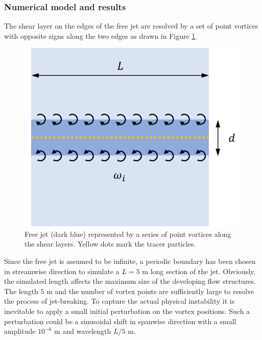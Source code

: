 \documentclass[a4paper,12pt,openany]{book}
\theoremstyle{break}
\begin{document}
\subsubsection{Numerical model and results}
The shear layer on the edges of the free jet are resolved by a set of point vortices with opposite signs along the two edges as drawn in Figure \ref{fig:shear_geom}.
\begin{figure}[H]
  \includegraphics[scale=0.6]{shear_geom.pdf}
  \centering
  \caption{Free jet (dark blue) represented by a series of point vortices along the shear layers. Yellow dots mark the tracer particles. }
  \label{fig:shear_geom}
\end{figure}\vspace*{3pt}
Since the free jet is assumed to be infinite, a periodic boundary has been chosen in streamwise direction to simulate a $L=5$ m long section of the jet. Obviously, the simulated length affects the maximum size of the developing flow structures. The length $5$ m and the number of vortex points are sufficiently large to resolve the process of jet-breaking. To capture the actual physical instability it is inevitable to apply a small initial perturbation on the vortex positions. Such a perturbation could be a sinusoidal shift in spanwise direction with a small amplitude $10^{-6}$ m and wavelength $L/5$ m.
\end{document}
